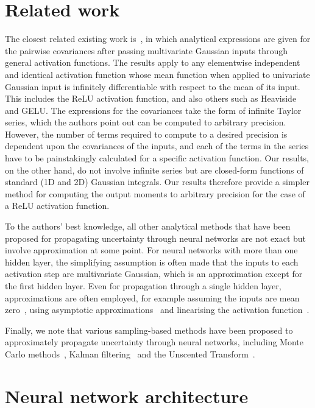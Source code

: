 \documentclass{article}
\begin{document}
\section{Related work}\label{related}

The closest related existing work is~\cite{wright2024analytic}, in which analytical expressions are given for the pairwise covariances after passing multivariate Gaussian inputs through general activation functions. The results apply to any elementwise independent and identical activation function whose mean function when applied to univariate Gaussian input is infinitely differentiable with respect to the mean of its input. This includes the ReLU activation function, and also others such as Heaviside and GELU. The expressions for the covariances take the form of infinite Taylor series, which the authors point out can be computed to arbitrary precision. However, the number of terms required to compute to a desired precision is dependent upon the covariances of the inputs, and each of the terms in the series have to be painstakingly calculated for a specific activation function. Our results, on the other hand, do not involve infinite series but are closed-form functions of standard (1D and 2D) Gaussian integrals. Our results therefore provide a simpler method for computing the output moments to arbitrary precision for the case of a ReLU activation function.

To the authors' best knowledge, all other analytical methods that have been proposed for propagating uncertainty through neural networks are not exact but involve approximation at some point. For neural networks with more than one hidden layer, the simplifying assumption is often made that the inputs to each activation step are multivariate Gaussian, which is an approximation except for the first hidden layer. Even for propagation through a single hidden layer, approximations are often employed, for example assuming the inputs are mean zero~\cite{bibi2018analytic}, using asymptotic approximations~\cite{wu2018deterministic} and linearising the activation function~\cite{diamzon2025uncertainty}. 

Finally, we note that various sampling-based methods have been proposed to approximately propagate uncertainty through neural networks, including Monte Carlo methods~\cite{monchot2023input}, Kalman filtering~\cite{titensky2018uncertainty} and the Unscented Transform~\cite{monchot2023input}.

\section{Neural network architecture}\label{architecture}
\end{document}
